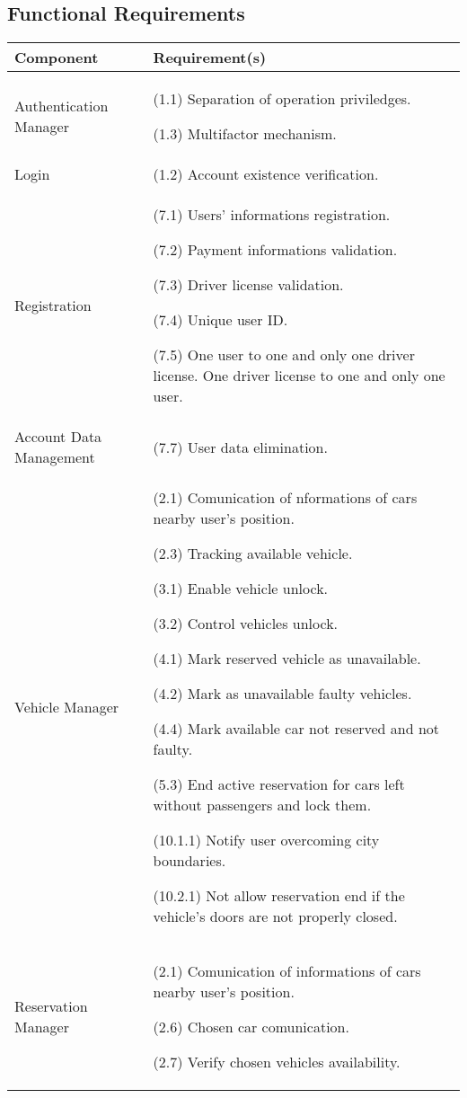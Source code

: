 \subsection{Functional Requirements}

\begin{longtable}{ |l|p{10cm}| }
	\hline
	\textbf{Component} & \textbf{Requirement(s)}\\ \hline
	Authentication Manager & (1.1) Separation of operation priviledges.

(1.3) Multifactor mechanism.\\ \hline
	Login & (1.2) Account existence verification.\\ \hline
	Registration & (7.1) Users' informations registration.

(7.2) Payment informations validation.

(7.3) Driver license validation.

(7.4) Unique user ID.

(7.5) One user to one and only one driver license. One driver license to one and only one user.\\ \hline

	Account Data Management & (7.7) User data elimination.\\ \hline

	Vehicle Manager & (2.1) Comunication of nformations of cars nearby user's position.

(2.3) Tracking available vehicle.

(3.1) Enable vehicle unlock.

(3.2) Control vehicles unlock.

(4.1) Mark reserved vehicle as unavailable.

(4.2) Mark as unavailable faulty vehicles.

(4.4) Mark available car not reserved and not faulty.

(5.3) End active reservation for cars left without passengers and lock them.

(10.1.1) Notify user overcoming city boundaries.

(10.2.1) Not allow reservation end if the vehicle's doors are not properly closed.
\\ \hline

	Reservation Manager & (2.1) Comunication of informations of cars nearby user's position.

(2.6) Chosen car comunication.

(2.7) Verify chosen vehicles availability.


\end{longtable}

